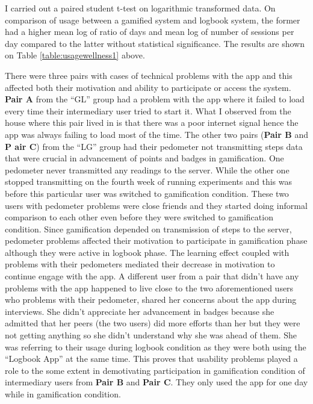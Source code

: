 I carried out a paired student t-test on logarithmic transformed data.  On comparison of usage between a gamified system and logbook system, the former had a higher mean log of ratio of days  and mean log of number of sessions per day compared to the latter without statistical significance.
The results are shown on Table \ref{table:usagewellness1} above.
 
There were three pairs with cases of technical problems with the app and this affected both their motivation and ability to participate or access the system. \textbf{Pair A} from the ``GL'' group had a problem with the app where it failed to load every time their intermediary user tried to start it. What I observed from the house where this pair lived in is that there was a poor internet signal hence the app was always failing to load most of the time. The other two pairs (\textbf{Pair B} and \textbf{P air C}) from the ``LG'' group had their pedometer not transmitting steps data that were crucial in advancement of points and badges in gamification. One pedometer never transmitted any readings to the server. While the other one stopped transmitting on the fourth week of running experiments and this was before this particular user was switched to gamification condition. These two users with pedometer problems were close friends and they started doing informal comparison to each other even before they were switched to gamification condition. Since gamification depended on transmission of steps to the server, pedometer problems affected their motivation to participate in gamification phase although they were active in logbook phase. The learning effect coupled with problems with their pedometers mediated their decrease in motivation to continue engage with the app.  A different user from a pair that didn't have any problems with the app happened to live close to the two aforementioned users who problems with their pedometer, shared her concerns about the app during interviews. She didn't appreciate her advancement in badges because she admitted that her peers (the two users) did more efforts than her but they were not getting anything so she didn't understand why she was ahead of them. She was referring to their usage during logbook condition as they were both using the ``Logbook App'' at the same time.  This proves that usability problems played a role to the some extent in demotivating participation in gamification condition  of intermediary users from \textbf{Pair B} and \textbf{Pair C}. They only used the app for one day while in gamification condition.

